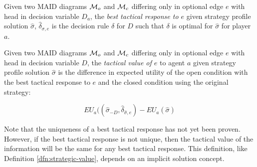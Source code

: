 \documentclass[../thesis.tex]{subfiles}
\begin{document}
\begin{dfn}
  \label{dfn:best-tactical-response}
  Given two MAID diagrams $\mathcal{M}_{o}$ and $\mathcal{M}_{c}$
  differing only in optional edge $e$ with head in decision
  variable $D_a$,
  the \emph{best tactical response to $e$} given
  strategy profile solution $\hat{\sigma}$, $\hat{\delta}_{\sigma,e}$
  is the decision rule $\delta$ for $D$ such
  that $\delta$ is optimal for $\hat{\sigma}$
  for player $a$.
\end{dfn}

\begin{dfn}
  \label{def:tactical-value}
  Given two MAID diagrams $\mathcal{M}_{o}$ and $\mathcal{M}_{c}$
  differing only in optional edge $e$ with head in decision
  variable $D$,
  the \emph{tactical value of $e$} to agent $a$ given
  strategy profile solution $\hat{\sigma}$
  is the difference in expected utility of
  the open condition with the best tactical response to $e$
  and the closed condition using the original strategy:

  $$EU_a((\hat{\sigma}_{-D},\hat{\delta}_{\hat{\sigma},e}) - EU_a(\hat{\sigma})$$
\end{dfn}


Note that the uniqueness of a best tactical response
has not yet been proven.
However, if the best tactical response is not unique,
then the tactical value of the information will be the
same for any best tactical response.
This definition, like Definition \ref{dfn:strategic-value},
depends on an implicit solution concept.

 
\end{document}
